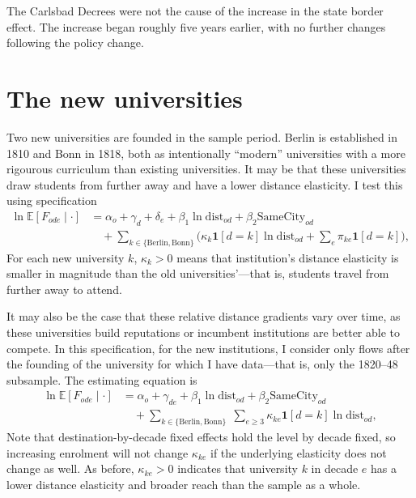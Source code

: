 \documentclass[11pt]{article}
\begin{document}
The Carlsbad Decrees were not the cause of the increase in the state border effect. The increase began roughly five years earlier, with no further changes following the policy change.

\section{The new universities}

Two new universities are founded in the sample period. Berlin is established in 1810 and Bonn in 1818, both as intentionally ``modern'' universities with a more rigourous curriculum than existing universities. It may be that these universities draw students from further away and have a lower distance elasticity. I test this using specification
\begin{equation}
\begin{split}
\ln \mathbb{E}\!\left[F_{ode} \mid \cdot\right]
  &= \alpha_o + \gamma_d + \delta_e
   + \beta_1 \ln \mathrm{dist}_{od}
   + \beta_2 \mathrm{SameCity}_{od} \\
  &\quad + \sum_{k \in \{\text{Berlin}, \text{Bonn}\}}
     \Big( \kappa_k \mathbf{1}[d = k] \ln \mathrm{dist}_{od}
     + \sum_{e} \pi_{ke} \mathbf{1}[d = k] \Big),
\end{split}
\label{eq:design_b_static}
\end{equation}
For each new university $k$, $\kappa_k > 0$ means that institution's distance elasticity is smaller in magnitude than the old universities'---that is, students travel from further away to attend.

It may also be the case that these relative distance gradients vary over time, as these universities build reputations or incumbent institutions are better able to compete. In this specification, for the new institutions, I consider only flows after the founding of the university for which I have data---that is, only the 1820--48 subsample. The estimating equation is
\begin{equation}
\begin{split}
\ln \mathbb{E}\!\left[F_{ode} \mid \cdot\right]
  &= \alpha_o + \gamma_{de}
   + \beta_1 \ln \mathrm{dist}_{od}
   + \beta_2 \mathrm{SameCity}_{od} \\
  &\quad + \sum_{k \in \{\text{Berlin}, \text{Bonn}\}} \; \sum_{e \geq 3}
     \kappa_{ke} \mathbf{1}[d = k] \ln \mathrm{dist}_{od},
\end{split}
\label{eq:design_b_dynamic}
\end{equation}
Note that destination-by-decade fixed effects hold the level by decade fixed, so increasing enrolment will not change $\kappa_{ke}$ if the underlying elasticity does not change as well. As before, $\kappa_{ke} > 0$ indicates that university $k$ in decade $e$ has a lower distance elasticity and broader reach than the sample as a whole.
\end{document}
